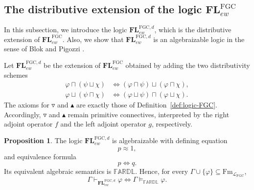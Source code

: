 \documentclass[final,12pt,times]{elsarticle}
\theoremstyle{plain}
\theoremstyle{definition}
\newtheorem{proposition}[definition]{Proposition}
\theoremstyle{break}
\newcommand{\FARDL}{\mathbb{FARDL}}
\newcommand{\FLFGC}{\mathbf{FL}^{\mathrm{FGC}}_{ew}}
\begin{document}
\subsection{The distributive extension of the logic \(\mathbf{FL}^{\mathrm{FGC}}_{ew}\)}
\label{subsec:distributive-calculus}

In this subsection, we introduce the logic \(\mathbf{FL}^{\mathrm{FGC},d}_{ew}\), which is the distributive extension of \(\mathbf{FL}^{\mathrm{FGC}}_{ew}\). Also, we show that \(\mathbf{FL}^{\mathrm{FGC},d}_{ew}\) is an algebraizable logic in the sense of Blok and Pigozzi \cite{BlokPigozzi}.
\medskip

Let \(\mathbf{FL}^{\mathrm{FGC},d}_{ew}\) be the extension of \(\FLFGC\)
obtained by adding the two distributivity schemes
\begin{align}
 \varphi\sqcap(\psi\sqcup\chi)
 &\Leftrightarrow
 (\varphi\sqcap\psi)\sqcup(\varphi\sqcap\chi),
 \tag{D1}\label{eq:dist-one}\\
 \varphi\sqcup(\psi\sqcap\chi)
 &\Leftrightarrow
 (\varphi\sqcup\psi)\sqcap(\varphi\sqcup\chi).
 \tag{D2}\label{eq:dist-two}
\end{align}
The axioms for \(\triangledown\) and \(\blacktriangle\) are exactly
those of Definition~\ref{def:logic-FGC}.  Accordingly,
\(\triangledown\) and \(\blacktriangle\) remain primitive connectives,
interpreted by the right adjoint operator \(f\) and the left adjoint operator \(g\),
respectively.

\begin{proposition}
\label{prop:alg-distributive}
The logic \(\mathbf{FL}^{\mathrm{FGC},d}_{ew}\) is algebraizable with defining
equation
\[
 p\approx1,
\]
and equivalence formula
\[
 p\Leftrightarrow q.
\]
Its equivalent algebraic semantics is \(\FARDL\).  Hence, for every
\(\Gamma\cup\{\varphi\}\subseteq
\mathrm{Fm}_{\mathcal L_{\mathrm{FGC}}}\),
\[
 \Gamma\vdash_{\mathbf{FL}^{\mathrm{FGC},d}_{ew}}\varphi
 \Longleftrightarrow
 \Gamma\models_{\FARDL}\varphi.
\]
\end{proposition}
\end{document}
